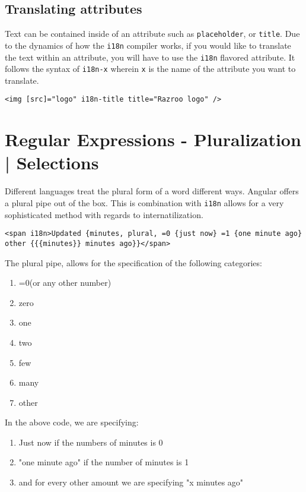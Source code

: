 
\subsection{Translating attributes}
Text can be contained inside of an attribute such as \lstinline{placeholder}, 
or \lstinline{title}. Due to the dynamics of how the \lstinline{i18n} compiler 
works, if you would like to translate the text within an attribute, you will 
have to use the \lstinline{i18n} flavored attribute. It follows the syntax of 
\lstinline{i18n-x} wherein \lstinline{x} is the name of the attribute you want
to translate. 

\begin{lstlisting}
<img [src]="logo" i18n-title title="Razroo logo" />
\end{lstlisting}

\section{ Regular Expressions - Pluralization | Selections }
Different languages treat the plural form of a word different ways. Angular 
offers a plural pipe out of the box. This is combination with \lstinline{i18n}
allows for a very sophisticated method with regards to internatilization. 

\begin{lstlisting}
<span i18n>Updated {minutes, plural, =0 {just now} =1 {one minute ago} other {{{minutes}} minutes ago}}</span>
\end{lstlisting}

The plural pipe, allows for the specification of the following categories: 
\begin{enumerate}
\item =0(or any other number)  
\item zero  
\item one
\item two
\item few
\item many
\item other
\end{enumerate}

In the above code, we are specifying: 
\begin{enumerate}
\item Just now if the numbers of minutes is 0 
\item "one minute ago" if the number of minutes is 1
\item and for every other amount we are specifying "x minutes ago" 
\end{enumerate}

